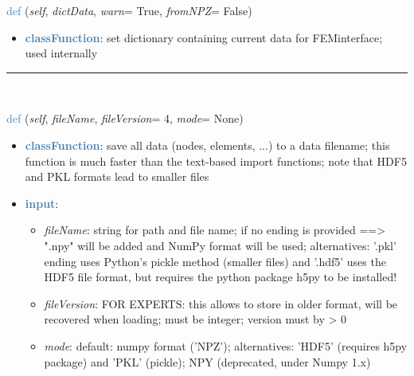 \begin{itemize}[leftmargin=1.4cm]
\begin{itemize}[leftmargin=1.4cm]
\begin{itemize}[leftmargin=1.4cm]
\begin{itemize}[leftmargin=0.5cm]
\begin{itemize}[leftmargin=1.4cm]
\begin{itemize}[leftmargin=1.4cm]
\begin{itemize}[leftmargin=1.4cm]
\begin{itemize}[leftmargin=0.5cm]
\begin{flushleft}
\noindent \textcolor{steelblue}{def {\bf {}}}\label{sec:FEM:FEMinterface:SetWithDictionary}
({\it self}, {\it dictData}, {\it warn}= True, {\it fromNPZ}= False)
\end{flushleft}
\setlength{\itemindent}{0.7cm}
\begin{itemize}[leftmargin=0.7cm]
\item[--]\textcolor{steelblue}{\bf classFunction}: set dictionary containing current data for FEMinterface; used internally
\vspace{12pt}\end{itemize}
%
\noindent\rule{8cm}{0.75pt}\vspace{1pt} \\ 
\begin{flushleft}
\noindent \textcolor{steelblue}{def {\bf {}}}\label{sec:FEM:FEMinterface:SaveToFile}
({\it self}, {\it fileName}, {\it fileVersion}= 4, {\it mode}= None)
\end{flushleft}
\setlength{\itemindent}{0.7cm}
\begin{itemize}[leftmargin=0.7cm]
\item[--]\textcolor{steelblue}{\bf classFunction}: save all data (nodes, elements, ...) to a data filename; this function is much faster than the text-based import functions; note that HDF5 and PKL formats lead to smaller files
\item[--]\textcolor{steelblue}{\bf input}: \vspace{-6pt}
\begin{itemize}[leftmargin=1.2cm]
\setlength{\itemindent}{-0.7cm}
\item[]{\it fileName}: string for path and file name; if no ending is provided ==> ".npy" will be added and NumPy format will be used; alternatives: '.pkl' ending uses Python's pickle method (smaller files) and '.hdf5' uses the HDF5 file format, but requires the python package h5py to be installed!
\item[]{\it fileVersion}: FOR EXPERTS: this allows to store in older format, will be recovered when loading; must be integer; version must by > 0
\item[]{\it mode}: default: numpy format ('NPZ'); alternatives: 'HDF5' (requires h5py package) and 'PKL' (pickle); NPY (deprecated, under Numpy 1.x)
\end{itemize}

\end{itemize}
\end{itemize}
\end{itemize}
\end{itemize}
\end{itemize}
\end{itemize}
\end{itemize}
\end{itemize}
\end{itemize}
